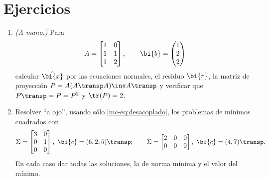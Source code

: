 \section*{Ejercicios}

\begin{enumerate}[leftmargin=*,label=\textbf{\thechapter.\arabic*},ref=\thechapter.\arabic*,itemsep=4pt]

\item\label{mc-ej:a-mano} \emph{(A mano.)} Para
\[
A=\begin{bmatrix}1&0\\ 1&1\\ 1&2\end{bmatrix},
\qquad
\bi{b}=\begin{pmatrix}1\\ 2\\ 2\end{pmatrix}
\]
calcular $\hat{\bi{x}}$ por las ecuaciones normales, el residuo $\bi{r}$, la
matriz de proyección $P=A(A\transp A)\inv A\transp$ y verificar que
$P\transp=P=P^2$ y $\tr(P)=2$.

\item\label{mc-ej:desacoplado} Resolver ``a ojo'', usando sólo
\eqref{mc-eq:desacoplado}, los problemas de mínimos cuadrados con
\[
\Sigma=\begin{bmatrix}3&0\\ 0&1\\ 0&0\end{bmatrix},\ \bi{c}=(6,2,5)\transp;
\qquad
\Sigma=\begin{bmatrix}2&0&0\\ 0&0&0\end{bmatrix},\ \bi{c}=(4,7)\transp .
\]
En cada caso dar todas las soluciones, la de norma mínima y el valor del
mínimo.


\end{enumerate}
